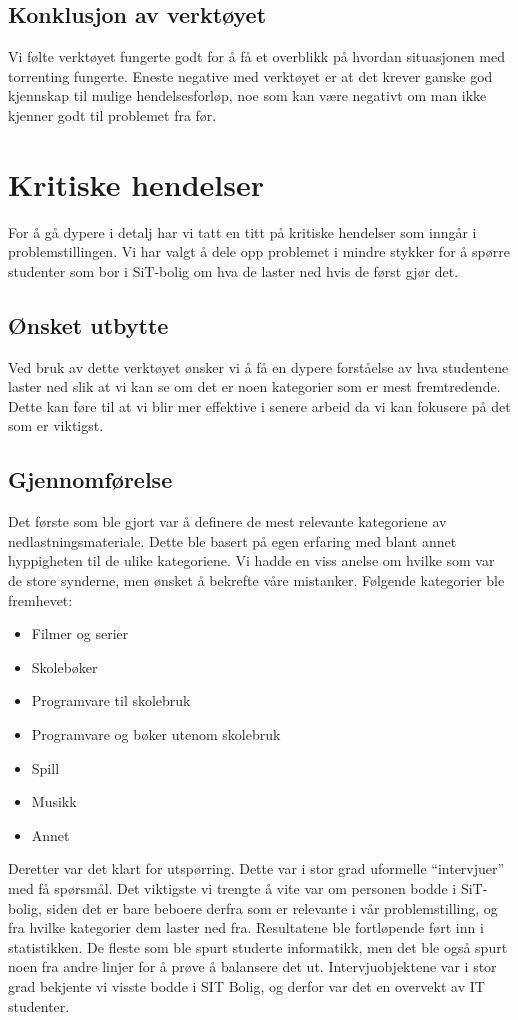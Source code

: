 \subsection{Konklusjon av verktøyet}
Vi følte verktøyet fungerte godt for å få et overblikk på hvordan situasjonen med torrenting fungerte. Eneste negative med verktøyet er at det krever ganske god kjennskap til mulige hendelsesforløp, noe som kan være negativt om man ikke kjenner godt til problemet fra før. 

\section{Kritiske hendelser}
For å gå dypere i detalj har vi tatt en titt på kritiske hendelser som inngår i problemstillingen. Vi har valgt å dele opp problemet i mindre stykker for å spørre studenter som bor i SiT-bolig om hva de laster ned hvis de først gjør det. 

\subsection{Ønsket utbytte}
Ved bruk av dette verktøyet ønsker vi å få en dypere forståelse av hva studentene laster ned slik at vi kan se om det er noen kategorier som er mest fremtredende. Dette kan føre til at vi blir mer effektive i senere arbeid da vi kan fokusere på det som er viktigst.

\subsection{Gjennomførelse}
Det første som ble gjort var å definere de mest relevante kategoriene av nedlastningsmateriale. Dette ble basert på egen erfaring med blant annet hyppigheten til de ulike kategoriene. Vi hadde en viss anelse om hvilke som var de store synderne, men ønsket å bekrefte våre mistanker. Følgende kategorier ble fremhevet: 
\begin{itemize}
    \item Filmer og serier
    \item Skolebøker
    \item Programvare til skolebruk
    \item Programvare og bøker utenom skolebruk
    \item Spill
    \item Musikk
    \item Annet
\end{itemize}

Deretter var det klart for utspørring. Dette var i stor grad uformelle ``intervjuer'' med få spørsmål. Det viktigste vi trengte å vite var om personen bodde i SiT-bolig, siden det er bare beboere derfra som er relevante i vår problemstilling, og fra hvilke kategorier dem laster ned fra. Resultatene ble fortløpende ført inn i statistikken. De fleste som ble spurt studerte informatikk, men det ble også spurt noen fra andre linjer for å prøve å balansere det ut. Intervjuobjektene var i stor grad bekjente vi visste bodde i SIT Bolig, og derfor var det en overvekt av IT studenter.

